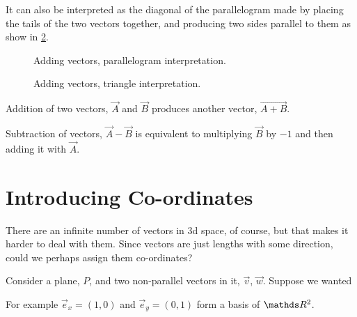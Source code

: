 It can also be interpreted as the diagonal of the parallelogram made by placing
the tails of the two vectors together, and producing two sides parallel to them as 
show in \cref{subfig: vectoradd2}.

\begin{marginfigure}
  \centering
  \begin{subfigure}[t]{\marginparwidth}
  \caption{Adding vectors, parallelogram interpretation.}
  \label{subfig: vectoradd1}
  \end{subfigure}
  \begin{subfigure}[t]{\marginparwidth}
  \caption{Adding vectors, triangle interpretation.}
  \label{subfig: vectoradd2}
  \end{subfigure}
  \caption{Addition of two vectors, \(\vec{A}\) and \(\vec{B}\) produces another
  vector, \(\vec{A + B}\).}
\end{marginfigure}

Subtraction of vectors, \(\vec{A} - \vec{B}\) is equivalent to multiplying \(\vec{B}\) 
by \(-1\) and then adding it with \(\vec{A}\).

\section{Introducing Co-ordinates}

There are an infinite number of vectors in 3d space, of course,
but that makes it harder to deal with them. Since vectors 
are just lengths with some direction, could we perhaps assign them 
co-ordinates? 


Consider a plane, \(P\), and two non-parallel vectors in it,
\(\vec{v}\), \(\vec{w}\). Suppose we wanted 

\begin{example}
  For example \(\vec{e}_x = (1, 0)\) and \(\vec{e}_y = (0, 1)\) form a basis of \(\RR^2\).
\end{example}